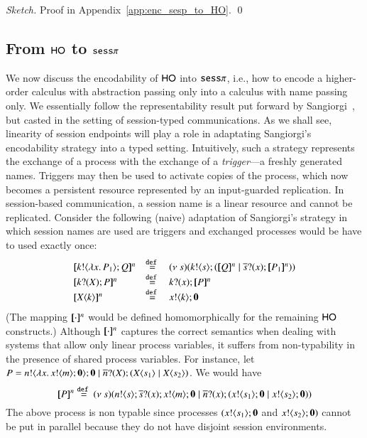\begin{proof}[Sketch]
	Proof in Appendix~\ref{app:enc_sesp_to_HO}.
	\qed
\end{proof}

\subsection{From $\mathsf{HO}$ to $\mathtt{sess}\pi$}

We now discuss the encodability of  $\mathsf{HO}$ into $\mathtt{sess}\pi$, 
i.e., how to encode a higher-order calculus with abstraction passing only
into a calculus with name passing only. 
We essentially follow the representability result put forward by 
Sangiorgi~\cite{San92,SaWabook}, but casted in the setting of session-typed communications. 
As we shall see, linearity of session endpoints will play a role in adaptating Sangiorgi's 
encodability strategy into a typed setting. 
Intuitively, such a strategy represents the exchange of a process with the exchange of 
a \emph{trigger}---a freshly generated names. 
Triggers may then be used to activate copies of the process, which now becomes a persistent 
resource represented by an input-guarded replication. In session-based communication, a session name 
is a linear resource and cannot be replicated. Consider the following (naive) adaptation of 
Sangiorgi's strategy in which session names are used are triggers and exchanged processes would be have to used exactly once:
\[
	\begin{array}{lcl}
		\pmap{\bout{k}{\abs{x}{P_1}} Q}{n} & \defeq &  \newsp{s}{\bout{k}{s} (\pmap{Q}{n} \Par \binp{\dual{s}}{x} \pmap{P_1}{n})} \\
		\pmap{\binp{k}{X} P}{n} & \defeq& \binp{k}{x} \pmap{P}{n}\\
		\pmap{\appl{X}{k}}{n} & \defeq & \bout{x}{k} \inact
	\end{array}
	\]
%
%
(The mapping $[\!\![\cdot]\!\!]^n$ would be defined homomorphically for the remaining $\mathsf{HO}$ constructs.)
Although $[\!\![\cdot]\!\!]^n$ captures the correct semantics when
dealing with systems that allow only linear process variables,
it suffers from non-typability in the presence
of shared process variables. For instance,
let $P = n ! \langle \lambda x.\,x ! \langle m \rangle ;\mathbf{0} \rangle ; \mathbf{0} \;|\; \overline{n} ? (X) ; (X\langle s_1 \rangle \;|\; X\langle s_2 \rangle)$.
We would have
\[
	[\!\![P]\!\!]^n \stackrel{\mathtt{def}\ }{=}
	(\nu\ s)(n ! \langle s \rangle ; \overline{s} ? (x) ; x ! \langle m \rangle ; \mathbf{0} \;|\; \overline{n} ? (x) ; (x ! \langle s_1 \rangle ; \mathbf{0} \;|\; x ! \langle s_2 \rangle ; \mathbf{0}))
\]
The above process is non typable since processes $(x ! \langle s_1 \rangle ; \mathbf{0}$ and $x ! \langle s_2 \rangle ; \mathbf{0})$
cannot be put in parallel because they do not have disjoint session environments.

